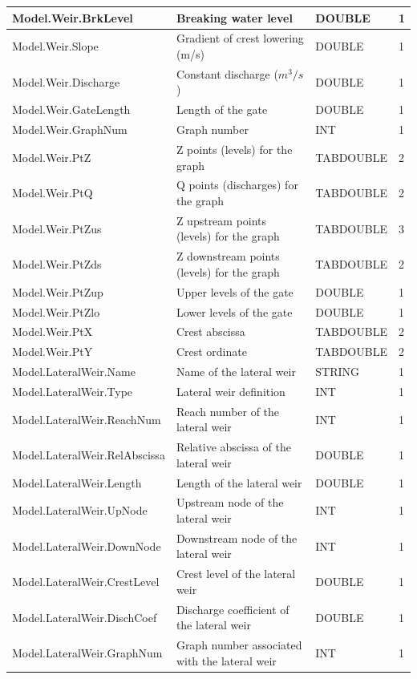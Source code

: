\documentclass[a4paper,11pt]{article}
\begin{document}
\begin{landscape}
\begin{table}[ht]
\begin{center}
\begin{tabular}{|l|l|l|l|}
\hline  Model.Weir.BrkLevel & Breaking water level & DOUBLE & 1 \\
\hline  Model.Weir.Slope & Gradient of crest lowering (m/s) & DOUBLE & 1 \\
\hline  Model.Weir.Discharge & Constant discharge ($m^3/s$) & DOUBLE & 1 \\
\hline  Model.Weir.GateLength & Length of the gate & DOUBLE & 1 \\
\hline  Model.Weir.GraphNum & Graph number & INT & 1 \\
\hline  Model.Weir.PtZ & Z points (levels) for the graph & TABDOUBLE & 2 \\
\hline  Model.Weir.PtQ & Q points (discharges) for the graph & TABDOUBLE & 2 \\
\hline  Model.Weir.PtZus & Z upstream points (levels) for the graph & TABDOUBLE & 3 \\
\hline  Model.Weir.PtZds & Z downstream points (levels) for the graph & TABDOUBLE & 2 \\
\hline  Model.Weir.PtZup & Upper levels of the gate & DOUBLE & 1 \\
\hline  Model.Weir.PtZlo & Lower levels of the gate & DOUBLE & 1 \\
\hline  Model.Weir.PtX & Crest abscissa & TABDOUBLE & 2 \\
\hline  Model.Weir.PtY & Crest ordinate & TABDOUBLE & 2 \\
\hline  Model.LateralWeir.Name & Name of the lateral weir & STRING & 1 \\
\hline  Model.LateralWeir.Type & Lateral weir definition & INT & 1 \\
\hline  Model.LateralWeir.ReachNum & Reach number of the lateral weir & INT & 1 \\
\hline  Model.LateralWeir.RelAbscissa & Relative abscissa of the lateral weir & DOUBLE & 1 \\
\hline  Model.LateralWeir.Length & Length of the lateral weir & DOUBLE & 1 \\
\hline  Model.LateralWeir.UpNode & Upstream node of the lateral weir & INT & 1 \\
\hline  Model.LateralWeir.DownNode & Downstream node of the lateral weir & INT & 1 \\
\hline  Model.LateralWeir.CrestLevel & Crest level of the lateral weir & DOUBLE & 1 \\
\hline  Model.LateralWeir.DischCoef & Discharge coefficient of the lateral weir & DOUBLE & 1 \\
\hline  Model.LateralWeir.GraphNum & Graph number associated with the lateral weir & INT & 1 \\

\end{tabular}
\end{center}
\end{table}
\end{landscape}
\end{document}
